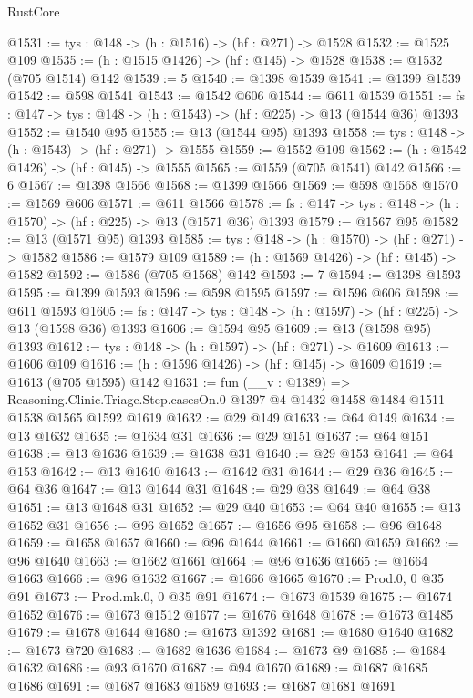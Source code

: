 \begin{lexlean}{RustCore}
\begin{coremodule}
@1531 := {tys : @148} -> (h : @1516) -> (hf : @271) -> @1528
@1532 := @1525 @109
@1535 := (h : @1515 @1426) -> (hf : @145) -> @1528
@1538 := @1532 (@705 @1514) @142
@1539 := 5
@1540 := @1398 @1539
@1541 := @1399 @1539
@1542 := @598 @1541
@1543 := @1542 @606
@1544 := @611 @1539
@1551 := {fs : @147} -> {tys : @148} -> (h : @1543) -> (hf : @225) -> @13 (@1544 @36) @1393
@1552 := @1540 @95
@1555 := @13 (@1544 @95) @1393
@1558 := {tys : @148} -> (h : @1543) -> (hf : @271) -> @1555
@1559 := @1552 @109
@1562 := (h : @1542 @1426) -> (hf : @145) -> @1555
@1565 := @1559 (@705 @1541) @142
@1566 := 6
@1567 := @1398 @1566
@1568 := @1399 @1566
@1569 := @598 @1568
@1570 := @1569 @606
@1571 := @611 @1566
@1578 := {fs : @147} -> {tys : @148} -> (h : @1570) -> (hf : @225) -> @13 (@1571 @36) @1393
@1579 := @1567 @95
@1582 := @13 (@1571 @95) @1393
@1585 := {tys : @148} -> (h : @1570) -> (hf : @271) -> @1582
@1586 := @1579 @109
@1589 := (h : @1569 @1426) -> (hf : @145) -> @1582
@1592 := @1586 (@705 @1568) @142
@1593 := 7
@1594 := @1398 @1593
@1595 := @1399 @1593
@1596 := @598 @1595
@1597 := @1596 @606
@1598 := @611 @1593
@1605 := {fs : @147} -> {tys : @148} -> (h : @1597) -> (hf : @225) -> @13 (@1598 @36) @1393
@1606 := @1594 @95
@1609 := @13 (@1598 @95) @1393
@1612 := {tys : @148} -> (h : @1597) -> (hf : @271) -> @1609
@1613 := @1606 @109
@1616 := (h : @1596 @1426) -> (hf : @145) -> @1609
@1619 := @1613 (@705 @1595) @142
@1631 := fun (__v : @1389) =>
  Reasoning.Clinic.Triage.Step.casesOn.{0} @1397 @4 @1432 @1458 @1484 @1511 @1538 @1565 @1592 @1619
@1632 := @29 @149
@1633 := @64 @149
@1634 := @13 @1632
@1635 := @1634 @31
@1636 := @29 @151
@1637 := @64 @151
@1638 := @13 @1636
@1639 := @1638 @31
@1640 := @29 @153
@1641 := @64 @153
@1642 := @13 @1640
@1643 := @1642 @31
@1644 := @29 @36
@1645 := @64 @36
@1647 := @13 @1644 @31
@1648 := @29 @38
@1649 := @64 @38
@1651 := @13 @1648 @31
@1652 := @29 @40
@1653 := @64 @40
@1655 := @13 @1652 @31
@1656 := @96 @1652
@1657 := @1656 @95
@1658 := @96 @1648
@1659 := @1658 @1657
@1660 := @96 @1644
@1661 := @1660 @1659
@1662 := @96 @1640
@1663 := @1662 @1661
@1664 := @96 @1636
@1665 := @1664 @1663
@1666 := @96 @1632
@1667 := @1666 @1665
@1670 := Prod.{0, 0} @35 @91
@1673 := Prod.mk.{0, 0} @35 @91
@1674 := @1673 @1539
@1675 := @1674 @1652
@1676 := @1673 @1512
@1677 := @1676 @1648
@1678 := @1673 @1485
@1679 := @1678 @1644
@1680 := @1673 @1392
@1681 := @1680 @1640
@1682 := @1673 @720
@1683 := @1682 @1636
@1684 := @1673 @9
@1685 := @1684 @1632
@1686 := @93 @1670
@1687 := @94 @1670
@1689 := @1687 @1685 @1686
@1691 := @1687 @1683 @1689
@1693 := @1687 @1681 @1691

\end{coremodule}
\end{lexlean}
